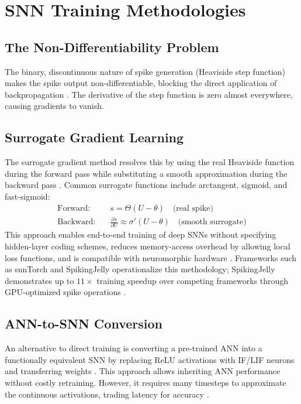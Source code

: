 \documentclass[12pt,a4paper]{article}
\begin{document}
\section{SNN Training Methodologies}
\label{sec:training}

\subsection{The Non-Differentiability Problem}
The binary, discontinuous nature of spike generation (Heaviside step function) makes the spike output non-differentiable, blocking the direct application of backpropagation \cite{Neftci2019}. The derivative of the step function is zero almost everywhere, causing gradients to vanish.

\subsection{Surrogate Gradient Learning}
The surrogate gradient method resolves this by using the real Heaviside function during the forward pass while substituting a smooth approximation during the backward pass \cite{Neftci2019}. Common surrogate functions include arctangent, sigmoid, and fast-sigmoid:
\begin{align}
    \text{Forward:} \quad & s = \Theta(U - \theta) \quad \text{(real spike)} \nonumber\\
    \text{Backward:} \quad & \frac{\partial s}{\partial U} \approx \sigma'(U - \theta) \quad \text{(smooth surrogate)} \nonumber
\end{align}
This approach enables end-to-end training of deep SNNs without specifying hidden-layer coding schemes, reduces memory-access overhead by allowing local loss functions, and is compatible with neuromorphic hardware \cite{Neftci2019}. Frameworks such as snnTorch and SpikingJelly operationalize this methodology; SpikingJelly demonstrates up to $11\times$ training speedup over competing frameworks through GPU-optimized spike operations \cite{Fang2023}.

\subsection{ANN-to-SNN Conversion}
An alternative to direct training is converting a pre-trained ANN into a functionally equivalent SNN by replacing ReLU activations with IF/LIF neurons and transferring weights \cite{Rueckauer2016}. This approach allows inheriting ANN performance without costly retraining. However, it requires many timesteps to approximate the continuous activations, trading latency for accuracy \cite{Rueckauer2016}.
\end{document}
